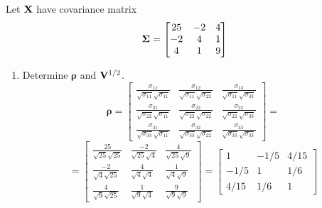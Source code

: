         Let $\bold{X}$ have covariance matrix
        \[
            \bold{\Sigma}
            =
            \begin{bmatrix}
                25 & -2 & 4 \\
                -2 & 4 & 1 \\
                4 & 1 & 9
            \end{bmatrix}
        \]
        \begin{enumerate}[label=(\alph*)]
            \item Determine $\bm{\rho}$ and $\bold{V}^{1/2}$.
            \[
                \bm{\rho}
                =
                \begin{bmatrix}
                    \frac{\sigma_{11}}{\sqrt{\sigma_{11}}\sqrt{\sigma_{11}}} & \frac{\sigma_{12}}{\sqrt{\sigma_{11}}\sqrt{\sigma_{22}}} & \frac{\sigma_{13}}{\sqrt{\sigma_{11}}\sqrt{\sigma_{33}}} \\
                    \frac{\sigma_{21}}{\sqrt{\sigma_{22}}\sqrt{\sigma_{11}}} & \frac{\sigma_{22}}{\sqrt{\sigma_{22}}\sqrt{\sigma_{22}}} & \frac{\sigma_{23}}{\sqrt{\sigma_{22}}\sqrt{\sigma_{33}}} \\
                    \frac{\sigma_{31}}{\sqrt{\sigma_{33}}\sqrt{\sigma_{11}}} & \frac{\sigma_{32}}{\sqrt{\sigma_{33}}\sqrt{\sigma_{22}}} & \frac{\sigma_{33}}{\sqrt{\sigma_{33}}\sqrt{\sigma_{33}}}
                \end{bmatrix}
                =
            \]
            \[
                =
                \begin{bmatrix}
                    \frac{25}{\sqrt{25}\sqrt{25}} & \frac{-2}{\sqrt{25}\sqrt{4}} & \frac{4}{\sqrt{25}\sqrt{9}} \\
                    \frac{-2}{\sqrt{4}\sqrt{25}} & \frac{4}{\sqrt{4}\sqrt{4}} & \frac{1}{\sqrt{4}\sqrt{9}} \\
                    \frac{4}{\sqrt{9}\sqrt{25}} & \frac{1}{\sqrt{9}\sqrt{4}} & \frac{9}{\sqrt{9}\sqrt{9}}
                \end{bmatrix}
                =
                \begin{bmatrix}
                    1 & -1/5 & 4/15 \\
                    -1/5 & 1 & 1/6 \\
                    4/15 & 1/6 & 1
                \end{bmatrix}
\]
\end{enumerate}
